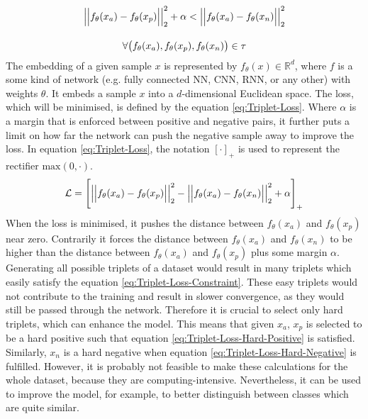 \begin{equation}
    \centering
    \begin{gathered}
        \Big|\Big|f_\theta(x_a) - f_\theta(x_p)\Big|\Big|_2^2 + \alpha < \Big|\Big|f_\theta(x_a) - f_\theta(x_n)\Big|\Big|_2^2 \\[10pt]
        \forall \big(f_\theta(x_a), f_\theta(x_p), f_\theta(x_n)\big) \in \tau
    \end{gathered}
    \label{eq:Triplet-Loss-Constraint}
\end{equation}
The embedding of a given sample $x$ is represented by $f_\theta(x) \in \mathbb{R}^d$, where $f$ is a some kind of network (e.g. fully connected \gls{NN}, \gls{CNN}, \gls{RNN}, or any other) with weights $\theta$. It embeds a sample $x$ into a $d$-dimensional Euclidean space. The loss, which will be minimised, is defined by the equation \ref{eq:Triplet-Loss}. Where $\alpha$ is a margin that is enforced between positive and negative pairs, it further puts a limit on how far the network can push the negative sample away to improve the loss. In equation \ref{eq:Triplet-Loss}, the notation $[\cdot]_+$ is used to represent the rectifier $\text{max}(0, \cdot)$.
\begin{equation}
    \centering
    \mathcal{L} = \Bigg [\Big|\Big|f_\theta(x_a) - f_\theta(x_p)\Big|\Big|_2^2 - \Big|\Big|f_\theta(x_a) - f_\theta(x_n)\Big|\Big|_2^2 + \alpha \Bigg]_+
    \label{eq:Triplet-Loss}
\end{equation}
When the loss is minimised, it pushes the distance between $f_\theta(x_a)$ and $f_\theta(x_p)$ near zero. Contrarily it forces the distance between $f_\theta(x_a)$ and $f_\theta(x_n)$ to be higher than the distance between $f_\theta(x_a)$ and $f_\theta(x_p)$ plus some margin $\alpha$.
\newline
\newline
Generating all possible triplets of a dataset would result in many triplets which easily satisfy the equation \ref{eq:Triplet-Loss-Constraint}. These easy triplets would not contribute to the training and result in slower convergence, as they would still be passed through the network. Therefore it is crucial to select only hard triplets, which can enhance the model. This means that given $x_a$, $x_p$ is selected to be a hard positive such that equation \ref{eq:Triplet-Loss-Hard-Positive} is satisfied. Similarly, $x_n$ is a hard negative when equation \ref{eq:Triplet-Loss-Hard-Negative} is fulfilled. However, it is probably not feasible to make these calculations for the whole dataset, because they are computing-intensive. Nevertheless, it can be used to improve the model, for example, to better distinguish between classes which are quite similar.
